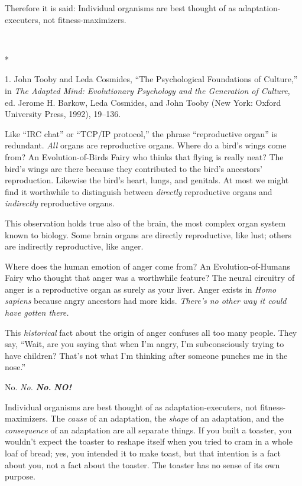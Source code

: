 {
 Therefore it is said: Individual organisms are best thought of as
adaptation-executers, not fitness-maximizers.}

{\centering
 \ ~
\par}

{\centering
 *
\par}


\bigskip

{
 1. John Tooby and Leda Cosmides, ``The
Psychological Foundations of Culture,'' in
\textit{The Adapted Mind: Evolutionary Psychology and the Generation of
Culture}, ed. Jerome H. Barkow, Leda Cosmides, and John Tooby (New
York: Oxford University Press, 1992), 19--136.}


{
 Like ``IRC chat'' or
``TCP/IP protocol,'' the phrase
``reproductive organ'' is redundant.
\textit{All} organs are reproductive organs. Where do a
bird's wings come from? An Evolution-of-Birds Fairy who
thinks that flying is really neat? The bird's wings are
there because they contributed to the bird's
ancestors' reproduction. Likewise the
bird's heart, lungs, and genitals. At most we might
find it worthwhile to distinguish between \textit{directly}
reproductive organs and \textit{indirectly} reproductive organs. }

{
 This observation holds true also of the brain, the most complex
organ system known to biology. Some brain organs are directly
reproductive, like lust; others are indirectly reproductive, like
anger.}

{
 Where does the human emotion of anger come from? An
Evolution-of-Humans Fairy who thought that anger was a worthwhile
feature? The neural circuitry of anger is a reproductive organ as
surely as your liver. Anger exists in \textit{Homo sapiens} because
angry ancestors had more kids. \textit{There's no other
way it could have gotten there.}}

{
 This \textit{historical} fact about the origin of anger confuses
all too many people. They say, ``Wait, are you saying
that when I'm angry, I'm subconsciously
trying to have children? That's not what
I'm thinking after someone punches me in the
nose.''}

{
 No. \textit{No.} \textbf{\textit{No.}} \textbf{\textit{NO!}}}

{
 Individual organisms are best thought of as adaptation-executers,
not fitness-maximizers. The \textit{cause} of an adaptation, the
\textit{shape} of an adaptation, and the \textit{consequence} of an
adaptation are all separate things. If you built a toaster, you
wouldn't expect the toaster to reshape itself when you
tried to cram in a whole loaf of bread; yes, you intended it to make
toast, but that intention is a fact about you, not a fact about the
toaster. The toaster has no sense of its own purpose.}

